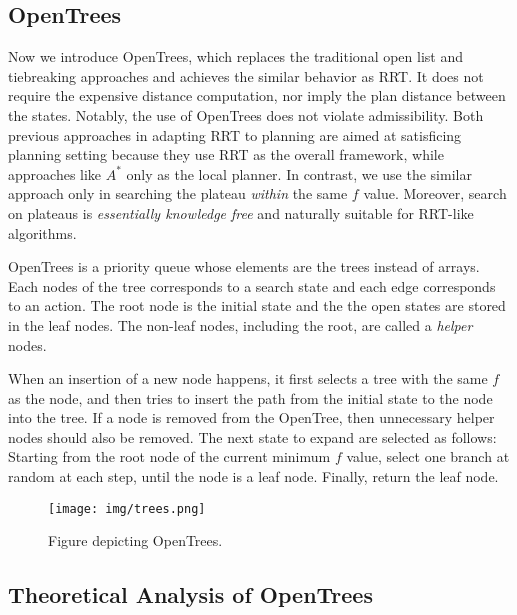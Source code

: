 \subsection{OpenTrees}

Now we introduce OpenTrees, which replaces the traditional open list and tiebreaking approaches and achieves the similar behavior as RRT.
It does not require the expensive distance computation, nor imply the plan distance between the states.
Notably, the use of OpenTrees does not violate admissibility. Both previous approaches in adapting RRT to planning are aimed at satisficing planning setting because they use RRT as the overall framework, while \sota approaches like $A^*$ only as the local planner. In contrast, we use the similar approach only in searching the plateau \emph{within} the same $f$ value. Moreover, search on plateaus is \emph{essentially knowledge free} and naturally suitable for RRT-like algorithms.

OpenTrees is a priority queue whose elements are the trees instead of arrays. Each nodes of the tree corresponds to a search state and each edge corresponds to an action.
The root node is the initial state and the the open states are stored in the leaf nodes.
The non-leaf nodes, including the root, are called a \emph{helper} nodes.

When an insertion of a new node happens, it first selects a tree with the same $f$ as the node, and then tries to insert the path from the initial state to the node into the tree. If a node is removed from the OpenTree, then unnecessary helper nodes should also be removed. The next state to expand are selected as follows: Starting from the root node of the current minimum $f$ value, select one branch at random at each step, until the node is a leaf node. Finally, return the leaf node.

\begin{figure}[htbp]
 \centering
 \texttt{[image: img/trees.png]}
 \caption{Figure depicting OpenTrees.}
 \label{trees}
\end{figure}

\subsection{Theoretical Analysis of OpenTrees}

